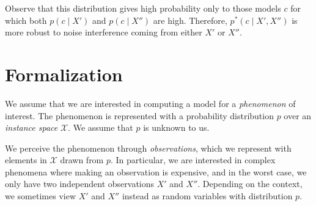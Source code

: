 Observe that this distribution gives high probability only to those models $c$ for which both $p(c \mid X')$ and $p(c \mid X'')$ are high. Therefore, $p^*(c \mid X', X'')$ is more robust to noise interference coming from either $X'$ or $X''$.
%













%



\section{Formalization}
\label{sec:formal}

We assume that we are interested in computing a model for a \emph{phenomenon} of interest. The phenomenon is represented with a probability distribution $p$ over an \emph{instance space} $\mathcal{X}$. We assume that $p$ is unknown to us.

We perceive the phenomenon through \emph{observations}, which we represent with elements in $\mathcal{X}$ drawn from $p$. In particular, we are interested in complex phenomena where making an observation is expensive, and in the worst case, we only have two independent observations $X'$ and $X''$. Depending on the context, we sometimes view $X'$ and $X''$ instead as random variables with distribution $p$.

